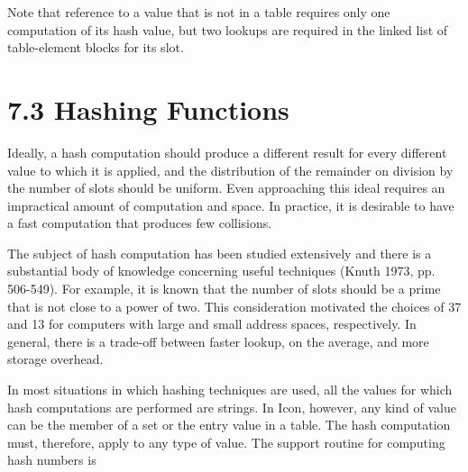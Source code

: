 Note that reference to a value that is not in a table requires only
one computation of its hash value, but two lookups are required in the
linked list of table-element blocks for its slot.


\section[7.3 Hashing Functions]{7.3 Hashing Functions}

Ideally, a hash computation should produce a different result for
every different value to which it is applied, and the distribution of
the remainder on division by the number of slots should be
uniform. Even approaching this ideal requires an impractical amount of
computation and space. In practice, it is desirable to have a fast
computation that produces few collisions.

The subject of hash computation has been studied extensively and there
is a substantial body of knowledge concerning useful techniques (Knuth
1973, pp. 506-549). For example, it is known that the number of slots
should be a prime that is not close to a power of two. This
consideration motivated the choices of 37 and 13 for computers with
large and small address spaces, respectively. In general, there is a
trade-off between faster lookup, on the average, and more storage
overhead.

In most situations in which hashing techniques are used, all the
values for which hash computations are performed are strings. In Icon,
however, any kind of value can be the member of a set or the entry
value in a table. The hash computation must, therefore, apply to any
type of value. The support routine for computing hash numbers is

